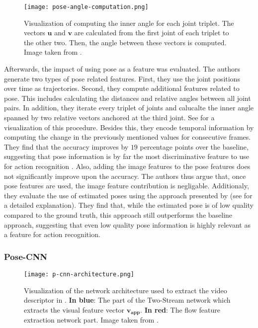 \begin{figure}[htb!]
    \centering
    \texttt{[image: pose-angle-computation.png]}
    \caption{Visualization of computing the inner angle for each joint triplet. The vectors $\bm{u}$ and $\bm{v}$ are calculated from the first joint of each triplet to the other two. Then, the angle between these vectors is computed. Image taken from \cite{jhuang_towards_2013}. }
    \label{fig:joint-angle-computation}
\end{figure}

Afterwards, the impact of using pose as a feature was evaluated.
The authors generate two types of pose related features. 
First, they use the joint positions over time as trajectories. 
Second, they compute additional features related to pose.
This includes calculating the distances and relative angles between all joint pairs. 
In addition, they iterate every triplet of joints and calucalte the inner angle spanned by two relative vectors anchored at the third joint.
See  for a visualization of this procedure.
Besides this, they encode temporal information by computing the change in the previously mentioned values for consecutive frames.
They find that the accuracy improves by $19$ percentage points over the baseline, suggesting that pose information is by far the most discriminative feature to use for action recognition \cite{jhuang_towards_2013}. 
Also, adding the image features to the pose features does not significantly improve upon the accuracy. 
The authors thus argue that, once pose features are used, the image feature contribution is negligable.
Additionaly, they evaluate the use of estimated poses using the approach presented by \cite{yang_articulated_2011} (see  for a detailed explanation). 
They find that, while the estimated pose is of low quality compared to the ground truth, this approach still outperforms the baseline approach, suggesting that even low quality pose information is highly relevant as a feature for action recognition.

\subsubsection{Pose-CNN}
\label{sec:pcnn}

\begin{figure}[htb!]
    \centering
    \texttt{[image: p-cnn-architecture.png]}
    \caption{Visualization of the network architecture used to extract the video descriptor in \cite{cheron_pcnn_2015}. \textbf{In blue}: The part of the Two-Stream network which extracts the visual feature vector $\bm{v_{app}}$. \textbf{In red}: The flow feature extraction network part. Image taken from \cite{cheron_pcnn_2015}. }
    \label{fig:p-cnn-architecture}
\end{figure}

